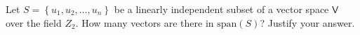 Let $S =\left\{u_1,u_2,\dots,u_n\right\}$ be a linearly independent
  subset of a vector space $\mathsf{V}$ over the field $Z_2$. How many
  vectors are there in $\text{span}(S)$? Justify your answer.

